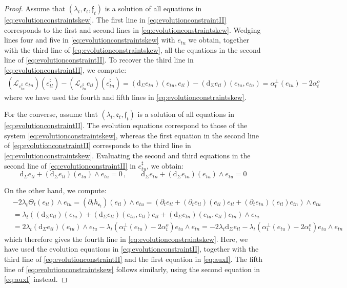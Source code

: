 \documentclass[10pt,reqno,a4paper]{amsart}
\theoremstyle{plain}
\theoremstyle{definition}
\theoremstyle{remark}
\theoremstyle{remark}
\def\dd{\mathrm{d}}
\def\cL{\mathcal{L}}
\def\cL{\mathcal{L}}
\def\fre{\mathfrak{e}}
\renewcommand{\(}{ (}
\renewcommand{\)}{ )}
\newcommand{\frf}{\mathfrak{f}}
\begin{document}
\begin{proof}
Assume that $(\lambda_t,\fre_t,\frf_t)$ is a solution of all equations in \eqref{eq:evolutionconstraintskew}. The first line in \eqref{eq:evolutionconstraintII} corresponds to the first and second lines in \eqref{eq:evolutionconstraintskew}. Wedging lines four and five in \eqref{eq:evolutionconstraintskew} with $e_{tu}$ we obtain, together with the third line of   \eqref{eq:evolutionconstraintskew}, all the equations in the second line of \eqref{eq:evolutionconstraintII}. To recover the third line in \eqref{eq:evolutionconstraintII}, we compute:
\begin{eqnarray*}
(\cL_{e_{tu}^{\sharp}}e_{tn})(e_{tl}^{\sharp}) - (\cL_{e_{tu}^{\sharp}}e_{tl})(e_{tn}^{\sharp}) = (\dd_{\Sigma} e_{tn}) (e_{tu} , e_{tl}) - (\dd_{\Sigma} e_{tl})(e_{tu},e_{tn}) = \alpha^{\perp}_t (e_{tu}) - 2\alpha^o_t
\end{eqnarray*}
where we have used the fourth and fifth lines in \eqref{eq:evolutionconstraintskew}.  

\noindent
For the converse, assume that $(\lambda_t,\fre_t,\frf_t)$ is a solution of all equations in \eqref{eq:evolutionconstraintII}. The evolution equations correspond to those of the system \eqref{eq:evolutionconstraintskew}, whereas the first equation in the second line of \eqref{eq:evolutionconstraintII} corresponds to the third line in \eqref{eq:evolutionconstraintskew}. Evaluating the second and third equations in the second line of \eqref{eq:evolutionconstraintII} in $e^{\sharp}_{tu}$, we obtain:
\begin{equation}
\label{eq:auxI}
\dd_{\Sigma} e_{tl} + (\dd_{\Sigma} e_{tl})(e_{tu})\wedge e_{tu} = 0\, , \qquad \dd_{\Sigma} e_{tn} + (\dd_{\Sigma} e_{tn})(e_{tu})\wedge e_{tu} = 0
\end{equation}

\noindent
On the other hand, we compute:
\begin{eqnarray*}
& -2\lambda_t \Theta_t (e_{tl}) \wedge e_{tu} = (\partial_t h_{\fre_t})(e_{tl})\wedge e_{tu} = (\partial_t e_{tl} + (\partial_t e_{tl} )(e_{tl}) e_{tl} + (\partial_t e_{tn} )(e_{tl}) e_{tn} ) \wedge e_{tu} \\ 
&  = \lambda_t ((\dd_{\Sigma} e_{tl})(e_{tu})  + (\dd_{\Sigma} e_{tl})(e_{tu},e_{tl}) e_{tl}  + (\dd_{\Sigma} e_{tn})(e_{tu},e_{tl}) e_{tn} )  \wedge e_{tu}\\
& =  2 \lambda_t (\dd_{\Sigma} e_{tl})(e_{tu}) \wedge e_{tu} - \lambda_t (\alpha^{\perp}_t (e_{tu}) - 2 \alpha^o_t) e_{tu}\wedge e_{tn} = - 2 \lambda_t  \dd_{\Sigma} e_{tl} - \lambda_t (\alpha^{\perp}_t (e_{tu}) - 2 \alpha^o_t) e_{tu}\wedge e_{tn}
\end{eqnarray*}
which therefore gives the fourth line in \eqref{eq:evolutionconstraintskew}. Here, we have used the evolution equations in \eqref{eq:evolutionconstraintII}, together with the third line of \eqref{eq:evolutionconstraintII} and the first equation in \eqref{eq:auxI}. The fifth line of \eqref{eq:evolutionconstraintskew} follows similarly, using the second equation in \eqref{eq:auxI} instead.
\end{proof} 
\end{document}

